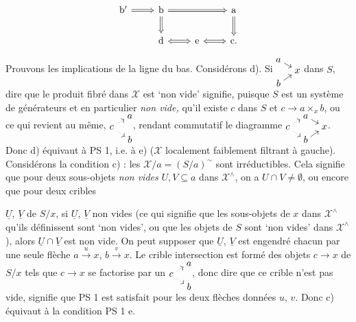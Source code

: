 \documentclass[11pt]{article}
\newcommand{\printedpage}[1]{\marginpar{\footnotesize p.~#1}}
\newcommand{\msp}[1]{\marginpar{\footnotesize [#1]}}
\newcommand{\X}{\mathcal{X}}
\begin{document}
\printedpage{14}

\[
\begin{tikzcd}
\mathrm{b}' \arrow[r, Rightarrow] & \mathrm{b} \arrow[rr, Rightarrow] \arrow[d, Rightarrow] & & \mathrm{a} \arrow[d, Rightarrow] \\
 & \mathrm{d} \arrow[r, Leftrightarrow] & \mathrm{e} \arrow[r, Leftrightarrow] & \mathrm{c}.
\end{tikzcd}
\]

Prouvons les implications de la ligne du bas. Considérons d). Si $\begin{tikzcd}[cramped, row sep=0.1em, column sep=0.8em, baseline=(current bounding box.center)] a \arrow[dr] & \\ & x \\ b \arrow[ur] & \end{tikzcd}$ dans $S$, dire que le produit fibré dans $\X$ est `non vide' signifie, puisque $S$ est un système de générateurs et en particulier \textit{non vide,} qu'il existe $c$ dans $S$ et $c\longrightarrow a\times_x b$, ou ce qui revient au même, $\begin{tikzcd}[cramped, row sep=0.1em, column sep=0.8em, baseline=(current bounding box.center)] & a \\ c \arrow[ur, dotted] \arrow[dr, dotted] & \\ & b \end{tikzcd}$, rendant commutatif le diagramme $\begin{tikzcd}[cramped, row sep=0.1em, column sep=0.8em, baseline=(current bounding box.center)] & a \arrow[dr] & \\ c \arrow[ur, dotted] \arrow[dr, dotted] & & x \\ & b \arrow[ur] & \end{tikzcd}$. Donc d) équivaut à PS 1, i.e. à e) ($\X$ localement faiblement filtrant à gauche). Considérons la condition c) : les $\X/a=(S/a)^\sim$ sont irréductibles. Cela signifie que pour deux sous-objets \textit{non vides} $U,V\subseteq a$ dans $\X^\wedge$, on a $U\cap V\neq\emptyset$, ou encore que pour deux cribles

\msp{page 22}$\underline{U}$, $\underline{V}$ de $S/x$, si $\underline{U}$, $\underline{V}$ non vides (ce qui signifie que les sous-objets de $x$ dans $\X^\wedge$ qu'ils définissent sont `non vides', ou que les objets de $S$ sont `non vides' dans $\X^\wedge$), alors $\underline{U}\cap\underline{V}$ est non vide. On peut supposer que $\underline{U}$, $\underline{V}$ est engendré chacun par une seule flèche $a\xrightarrow{u}x$, $b\xrightarrow{v}x$. Le crible intersection est formé des objets $c\longrightarrow x$ de $S/x$ tels que $c\longrightarrow x$ se factorise par un $\begin{tikzcd}[cramped, row sep=0.1em, column sep=0.8em, baseline=(current bounding box.center)] & a \\ c \arrow[ur, dotted] \arrow[dr, dotted] & \\ & b \end{tikzcd}$, donc dire que ce crible n'est pas vide, signifie que PS 1 est satisfait pour les deux flèches données $u$, $v$. Donc c) équivaut à la condition PS 1 e.
\end{document}
